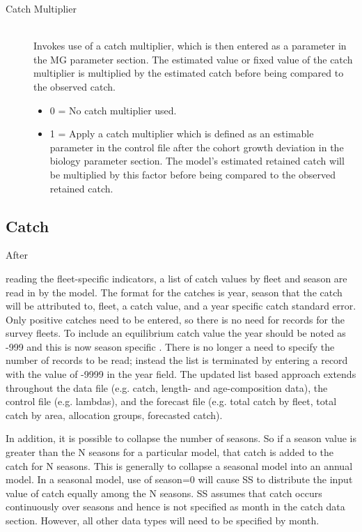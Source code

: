 \begin{description}
  \item[\hypertarget{CatchMult}{Catch Multiplier}] \hfill\\
  Invokes use of a catch multiplier, which is then entered as a parameter in the MG parameter section.  The estimated value or fixed value of the catch multiplier is multiplied by the estimated catch before being compared to the observed catch. 
	  \begin{itemize}
	  	\item 0 = No catch multiplier used.
	  	\item 1 = Apply a catch multiplier which is defined as an estimable parameter in the control file after the cohort growth deviation in the biology parameter section. The model’s estimated retained catch will be multiplied by this factor before being compared to the observed retained catch.
	  \end{itemize}  
\end{description}

\subsection{Catch}
\hypertarget{CatchFormat}{After} reading the fleet-specific indicators, a list of catch values by fleet and season are read in by the model.  The format for the catches is year, season that the catch will be attributed to, fleet, a catch value, and a year specific catch standard error.   Only positive catches need to be entered, so there is no need for records for the survey fleets.  To include an equilibrium catch value the year should be noted as -999 and this is now season specific .  \hypertarget{ListBased}{There} is no longer a need to specify the number of records to be read; instead the list is terminated by entering a record with the value of -9999 in the year field. The updated list based approach extends throughout the data file (e.g. catch, length- and age-composition data), the control file (e.g. lambdas), and the forecast file (e.g. total catch by fleet, total catch by area, allocation groups, forecasted catch).

In addition, it is possible to collapse the number of seasons.  So if a season value is greater than the N seasons for a particular model, that catch is added to the catch for N seasons.  This is generally to collapse a seasonal model into an annual model.  In a seasonal model, use of season=0 will cause SS to distribute the input value of catch equally among the N seasons.  SS assumes that catch occurs continuously over seasons and hence is not specified as month in the catch data section.  However, all other data types will need to be specified by month.


